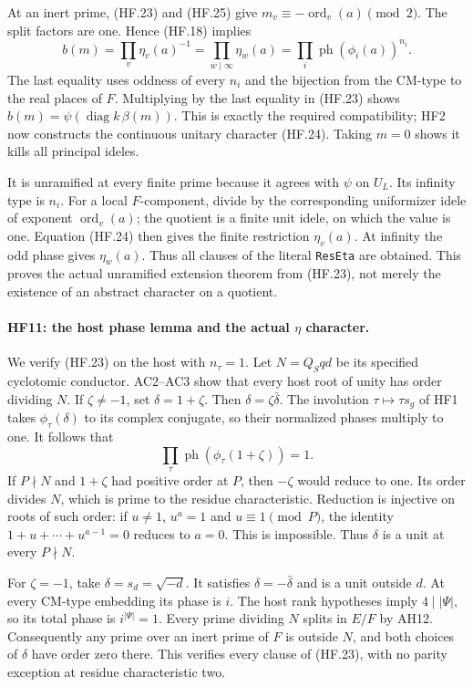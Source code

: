 At an inert prime, (HF.23) and (HF.25) give
$m_v\equiv-\operatorname{ord}_v(a)\pmod2$.
The split factors are one. Hence (HF.18) implies
\[
 b(m)=\prod_v\eta_v(a)^{-1}
                =\prod_{w\mid\infty}\eta_w(a)
                =\prod_i\operatorname{ph}(\phi_i(a))^{n_i}.
 \tag{HF.26}
\]
The last equality uses oddness of every $n_i$ and the
bijection from the CM-type to the real places of $F$.
Multiplying by the last equality in (HF.23) shows
$b(m)=\psi(\operatorname{diag}k\,\beta(m))$.
This is exactly the required compatibility; HF2 now
constructs the continuous unitary character (HF.24).
Taking $m=0$ shows it kills all principal ideles.

It is unramified at every finite prime because it agrees
with $\psi$ on $U_L$. Its infinity type is $n_i$.
For a local $F$-component, divide by the corresponding
uniformizer idele of exponent $\operatorname{ord}_v(a)$;
the quotient is a finite unit idele, on which the value is
one. Equation (HF.24) then gives the finite restriction
$\eta_v(a)$. At infinity the odd phase gives
$\eta_w(a)$. Thus all clauses of the literal
\texttt{ResEta} are obtained. This proves the actual
unramified extension theorem from (HF.23), not merely
the existence of an abstract character on a quotient.

\paragraph{HF11: the host phase lemma and the actual $\eta$ character.}
We verify (HF.23) on the host with $n_\tau=1$.
Let $N=Q_Sqd$ be its specified cyclotomic conductor.
AC2--AC3 show that every host root of unity has order
dividing $N$. If $\zeta\ne-1$, set $\delta=1+\zeta$.
Then $\delta=\zeta\bar\delta$.
The involution $\tau\mapsto\tau s_g$ of HF1 takes
$\phi_\tau(\delta)$ to its complex conjugate, so their
normalized phases multiply to one. It follows that
\[
                 \prod_\tau\operatorname{ph}
                         (\phi_\tau(1+\zeta))=1.       \tag{HF.27}
\]
If $P\nmid N$ and $1+\zeta$ had positive order at $P$,
then $-\zeta$ would reduce to one. Its order divides
$N$, which is prime to the residue characteristic.
Reduction is injective on roots of such order: if
$u\ne1$, $u^a=1$ and $u\equiv1\pmod P$, the identity
$1+u+\cdots+u^{a-1}=0$ reduces to $a=0$.
This is impossible. Thus $\delta$ is a unit at every
$P\nmid N$.

For $\zeta=-1$, take $\delta=s_d=\sqrt{-d}$.
It satisfies $\delta=-\bar\delta$ and is a unit outside
$d$. At every CM-type embedding its phase is $i$.
The host rank hypotheses imply $4\mid|\Psi|$, so its
total phase is $i^{|\Psi|}=1$.
Every prime dividing $N$ splits in $E/F$ by AH12.
Consequently any prime over an inert prime of $F$
is outside $N$, and both choices of $\delta$ have
order zero there. This verifies every clause of
(HF.23), with no parity exception at residue characteristic
two.

